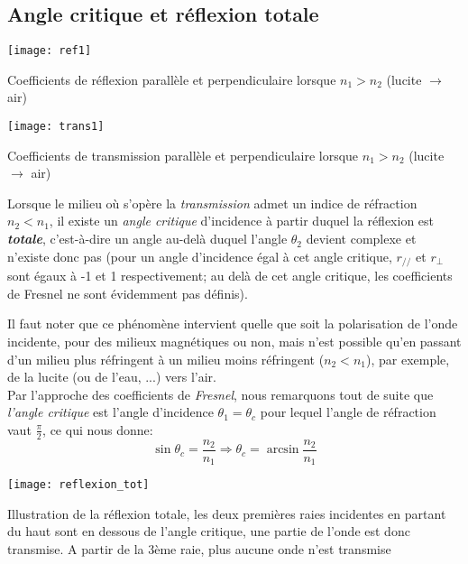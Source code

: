 
\subsection{Angle critique et réflexion totale}
\begin{marginfigure}%
	\texttt{[image: ref1]}
	\caption{Coefficients de réflexion parallèle et perpendiculaire lorsque $n_1>n_2$ (lucite $\rightarrow$ air)}
\end{marginfigure} 
\begin{marginfigure}%
	\texttt{[image: trans1]}
	\caption{Coefficients de transmission parallèle et perpendiculaire lorsque $n_1>n_2$ (lucite $\rightarrow$ air)}
\end{marginfigure} 
Lorsque le milieu où s'opère la \textit{transmission} admet un indice de réfraction $n_{2}<n_{1}$, il existe un \textit{angle critique} d'incidence à partir duquel la réflexion est \textit{\textbf{totale}}, c'est-à-dire un angle au-delà duquel l'angle $\theta_2$ devient complexe et n'existe donc pas (pour un angle d'incidence égal à cet angle critique, $r_{//}$ et $r_{\perp}$ sont égaux à  -1 et 1 respectivement; au delà de cet angle critique, les coefficients de Fresnel ne sont évidemment pas définis). 

Il faut noter que ce phénomène intervient quelle que soit la polarisation de l'onde incidente, pour des milieux magnétiques ou non, mais n'est possible qu'en passant d'un milieu plus réfringent à un milieu moins réfringent ($n_{2} < n_1$), par exemple, de la lucite (ou de l'eau, ...) vers l'air.\\ 

Par l'approche des coefficients de \textit{Fresnel}, nous remarquons tout de suite que \textit{l'angle critique} est l'angle d'incidence $\theta_{1} = \theta_{c}$ pour lequel l'angle de réfraction vaut $\frac{\pi}{2}$, ce qui nous donne: 
\[\sin \theta_{c} = \frac{n_{2}}{n_{1}} \Rightarrow \theta_{c} = \arcsin \frac{n_{2}}{n_{1}}\]
\begin{marginfigure}%
	\texttt{[image: reflexion\_tot]}
	\caption{Illustration de la réflexion totale, les deux premières raies incidentes en partant du haut sont en dessous de l'angle critique, une partie de l'onde est donc transmise. A partir de la 3ème raie, plus aucune onde n'est transmise}
\end{marginfigure}
